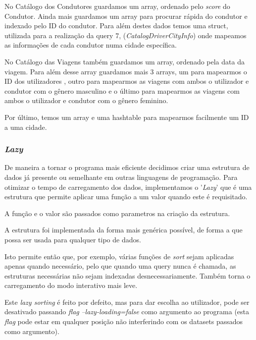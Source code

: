\documentclass{article}
\begin{document}
            No Catálogo dos Condutores guardamos um array, ordenado pelo \emph{score} do Condutor.
            Ainda mais guardamos um array para procurar rápida do condutor e indexado pelo ID do
            condutor. Para além destes dados temos uma struct, utilizada para a realização da query 7, 
            (\emph{CatalogDriverCityInfo}) onde mapeamos as informações de cada condutor numa cidade 
            específica.

            No Catálogo das Viagens também guardamos um array, ordenado pela data da
            viagem. Para além desse array guardamos mais 3 arrays, um para mapearmos o ID dos utilizadores
            , outro para mapearmos as viagens com ambos o utilizador e condutor com o gênero masculino e o
            último para mapearmos as viagens com ambos o utilizador e condutor com o gênero feminino.

            Por último, temos um array e uma hashtable para mapearmos facilmente um ID a uma cidade.            
            
        \subsubsection{\emph{Lazy}}
            De maneira a tornar o programa mais eficiente decidimos criar uma
            estrutura de dados já presente ou semelhante em outras linguagens de programação.
            Para otimizar o tempo de carregamento dos dados, implementamos o '\emph{Lazy}' que é uma
            estrutura que permite aplicar uma função a um valor quando este é requisitado.

            A função e o valor são passados como parametros na criação da estrutura.

            A estrutura foi implementada da forma mais genérica possível, de forma a que
            possa ser usada para qualquer tipo de dados.

            Isto permite então que, por exemplo, várias funções de \emph{sort} sejam aplicadas
            apenas quando necessário, pelo que quando uma query nunca é chamada, as estruturas necessárias
            não sejam indexadas desnecessariamente. Também torna o carregamento do modo interativo
            mais leve. 

            Este \emph{lazy sorting} é feito por defeito, mas para dar escolha ao utilizador,
            pode ser desativado passando \emph{flag} \emph{--lazy-loading=false}
            como argumento ao programa (esta \emph{flag} pode estar em qualquer
            posição não interferindo com os datasets passados como argumento).
\end{document}
